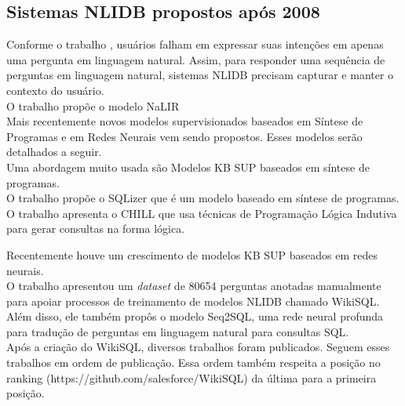 \documentclass{article}
\begin{document}

\subsection{Sistemas NLIDB propostos após 2008\label{novos}}


Conforme o trabalho \citep{akula2013novel}, usuários falham em expressar suas intenções em apenas uma pergunta em linguagem natural. Assim, para responder uma sequência de perguntas em linguagem natural, sistemas NLIDB precisam capturar e manter o contexto do usuário. \\

O trabalho \citep{li2014constructing} propõe o modelo NaLIR \\

Mais recentemente novos modelos supervisionados baseados em Síntese de Programas e em Redes Neurais vem sendo propostos. Esses modelos serão detalhados a seguir.\\

Uma abordagem muito usada são Modelos KB SUP baseados em síntese de programas.\\

O trabalho \citep{yaghmazadeh2017sqlizer} propõe o SQLizer que é um modelo baseado em síntese de programas. \\

O trabalho \citep{zelle1996learning} apresenta o CHILL que usa técnicas de Programação Lógica Indutiva para gerar consultas na forma lógica.

Recentemente houve um crescimento de modelos KB SUP baseados em redes neurais.\\

O trabalho \citep{zhong2017seq2sql} apresentou um \textit{dataset} de 80654 perguntas anotadas manualmente para apoiar processos de treinamento de modelos NLIDB chamado WikiSQL. Além disso, ele também propôs o modelo Seq2SQL, uma rede neural profunda para tradução de perguntas em linguagem natural para consultas SQL. \\

Após a criação do WikiSQL, diversos trabalhos foram publicados. Seguem esses trabalhos em ordem de publicação. Essa ordem também respeita a posição no ranking (https://github.com/salesforce/WikiSQL) da última para a primeira posição.\\
\end{document}
